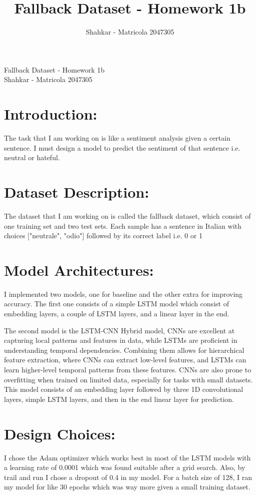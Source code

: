 \documentclass[11pt]{article}
\title{Fallback Dataset  -  Homework 1b }
\author{Shahkar - Matricola 2047305 }
\begin{document}
\begin{center}
    \huge{Fallback Dataset  -  Homework 1b }\\ [10pt]
    \large{Shahkar - Matricola 2047305}
\end{center}

\section{Introduction:}
The task that I am working on is like a sentiment analysis given a certain sentence. I must design a model to predict the sentiment of that sentence i.e. neutral or hateful. 
\section{Dataset Description: }
The dataset that I am working on is called the fallback dataset, which consist of one training set and two test sets. Each sample has a sentence in Italian with choices ["neutrale", "odio"] followed by its correct label i.e. 0 or 1
\section{Model Architectures: } 
I implemented two models, one for baseline and the other extra for improving accuracy. The first one consists of a simple LSTM model which consist of embedding layers, a couple of LSTM layers, and a linear layer in the end. 

The second model is the LSTM-CNN Hybrid model, CNNs are excellent at capturing local patterns and features in data, while LSTMs are proficient in understanding temporal dependencies. Combining them allows for hierarchical feature extraction, where CNNs can extract low-level features, and LSTMs can learn higher-level temporal patterns from these features. CNNs are also prone to overfitting when trained on limited data, especially for tasks with small datasets. This model consists of an embedding layer followed by three 1D convolutional layers, simple LSTM layers, and then in the end linear layer for prediction.
\section{Design Choices: } 
I chose the Adam optimizer which works best in most of the LSTM models with a learning rate of 0.0001 which was found suitable after a grid search. Also, by trail and run I chose a dropout of 0.4 in my model. For a batch size of 128, I ran my model for like 30 epochs which was way more given a small training dataset.
\end{document}
